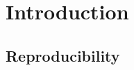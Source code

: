 \chapter{Introduction}\label{ch:Introduction}


\section{Reproducibility}\label{sec:reproducibility}

